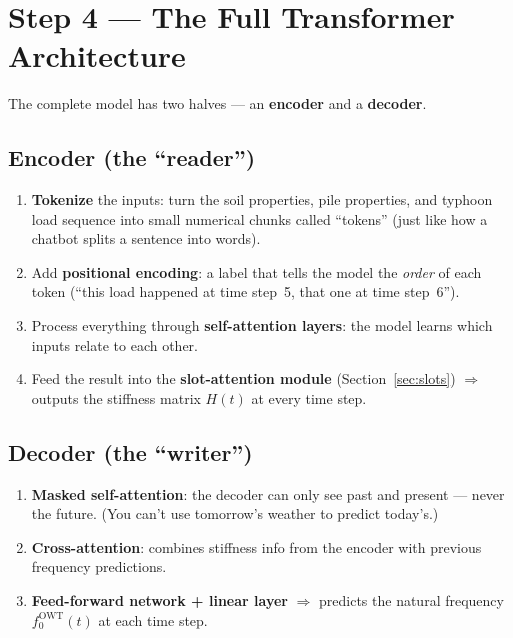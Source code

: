 \documentclass[11pt,a4paper]{article}
\begin{document}
\section{Step 4 --- The Full Transformer Architecture}
\label{sec:transformer}

The complete model has two halves --- an \textbf{encoder} and a
\textbf{decoder}.

\subsection{Encoder (the ``reader'')}

\begin{enumerate}[noitemsep]
  \item \textbf{Tokenize} the inputs: turn the soil properties, pile
        properties, and typhoon load sequence into small numerical chunks
        called ``tokens'' (just like how a chatbot splits a sentence into
        words).
  \item Add \textbf{positional encoding}: a label that tells the model the
        \textit{order} of each token (``this load happened at time step~5,
        that one at time step~6'').
  \item Process everything through \textbf{self-attention layers}: the model
        learns which inputs relate to each other.
  \item Feed the result into the \textbf{slot-attention module}
        (Section~\ref{sec:slots}) $\Rightarrow$ outputs the stiffness matrix
        $H(t)$ at every time step.
\end{enumerate}

\subsection{Decoder (the ``writer'')}

\begin{enumerate}[noitemsep]
  \item \textbf{Masked self-attention}: the decoder can only see past and
        present --- never the future.  (You can't use tomorrow's weather to
        predict today's.)
  \item \textbf{Cross-attention}: combines stiffness info from the encoder
        with previous frequency predictions.
  \item \textbf{Feed-forward network + linear layer} $\Rightarrow$ predicts
        the natural frequency $f_0^{\text{OWT}}(t)$ at each time step.
\end{enumerate}
\end{document}
